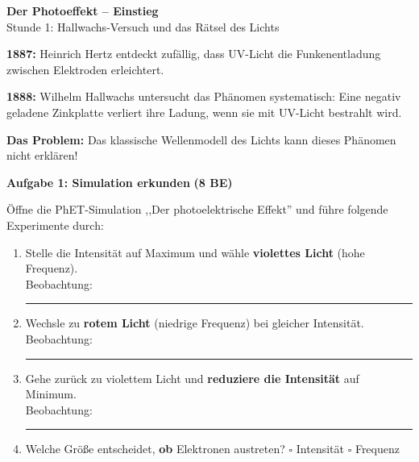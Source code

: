 \documentclass[11pt,a4paper]{article}
\begin{document}
\begin{center}
{\Large\textbf{Der Photoeffekt -- Einstieg}}\\[0.3em]
{\normalsize Stunde 1: Hallwachs-Versuch und das Rätsel des Lichts}
\end{center}

\vspace{0.5em}


\begin{tcolorbox}[merkbox={Historischer Hintergrund}]
\textbf{1887:} Heinrich Hertz entdeckt zufällig, dass UV-Licht die Funkenentladung zwischen Elektroden erleichtert.

\textbf{1888:} Wilhelm Hallwachs untersucht das Phänomen systematisch: Eine negativ geladene Zinkplatte verliert ihre Ladung, wenn sie mit UV-Licht bestrahlt wird.

\textbf{Das Problem:} Das klassische Wellenmodell des Lichts kann dieses Phänomen nicht erklären!
\end{tcolorbox}

\vspace{0.5em}


\textbf{Aufgabe 1: Simulation erkunden} \hfill \textbf{(8 BE)}

Öffne die PhET-Simulation ,,Der photoelektrische Effekt'' und führe folgende Experimente durch:

\begin{enumerate}[label=\alph*)]
\item Stelle die Intensität auf Maximum und wähle \textbf{violettes Licht} (hohe Frequenz).\\
Beobachtung: \rule{0.8\textwidth}{0.4pt}

\vspace{0.5em}

\item Wechsle zu \textbf{rotem Licht} (niedrige Frequenz) bei gleicher Intensität.\\
Beobachtung: \rule{0.8\textwidth}{0.4pt}

\vspace{0.5em}

\item Gehe zurück zu violettem Licht und \textbf{reduziere die Intensität} auf Minimum.\\
Beobachtung: \rule{0.8\textwidth}{0.4pt}

\vspace{0.5em}

\item Welche Größe entscheidet, \textbf{ob} Elektronen austreten? \hfill $\square$ Intensität \quad $\square$ Frequenz
\end{enumerate}
\end{document}
